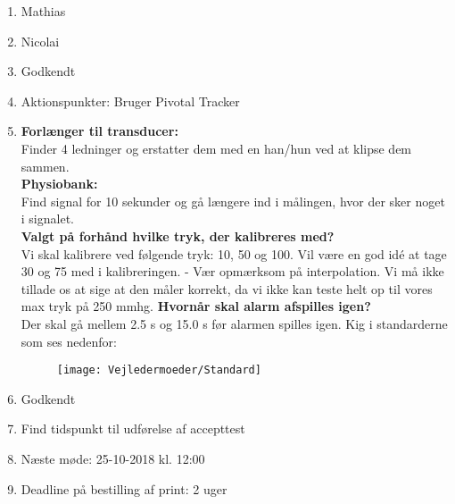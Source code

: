 \begin{enumerate}
	\item Mathias
	\item Nicolai
	\item Godkendt
	\item Aktionspunkter: Bruger Pivotal Tracker
	\item \textbf{Forlænger til transducer:} \\
	Finder 4 ledninger og erstatter dem med en han/hun ved at klipse dem sammen. \\
	\textbf{Physiobank:} \\
	Find signal for 10 sekunder og gå længere ind i målingen, hvor der sker noget i signalet. \\
	\textbf{Valgt på forhånd hvilke tryk, der kalibreres med?} \\
	Vi skal kalibrere ved følgende tryk: 10, 50 og 100. Vil være en god idé at tage 30 og 75 med i kalibreringen. - Vær opmærksom på interpolation. Vi må ikke tillade os at sige at den måler korrekt, da vi ikke kan teste helt op til vores max tryk på 250 mmhg.
	\textbf{Hvornår skal alarm afspilles igen?} \\
	Der skal gå mellem 2.5 s og 15.0 s før alarmen spilles igen. Kig i standarderne som ses nedenfor:
	
	\begin{figure}[h!]
		\centering
		\texttt{[image: Vejledermoeder/Standard]}
	\end{figure}
	
	\item Godkendt
	\item Find tidspunkt til udførelse af accepttest
	\item Næste møde: 25-10-2018 kl. 12:00 
	\item Deadline på bestilling af print: 2 uger
	
\end{enumerate}

\clearpage